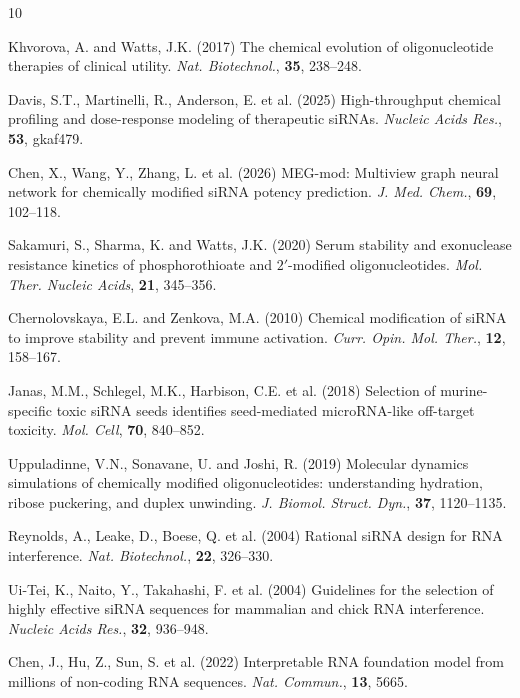 \documentclass[twocolumn]{article}
\begin{document}

\begin{thebibliography}{10}

Khvorova, A. and Watts, J.K. (2017) The chemical evolution of oligonucleotide therapies of clinical utility. \textit{Nat. Biotechnol.}, \textbf{35}, 238--248.

Davis, S.T., Martinelli, R., Anderson, E. et al. (2025) High-throughput chemical profiling and dose-response modeling of therapeutic siRNAs. \textit{Nucleic Acids Res.}, \textbf{53}, gkaf479.

Chen, X., Wang, Y., Zhang, L. et al. (2026) MEG-mod: Multiview graph neural network for chemically modified siRNA potency prediction. \textit{J. Med. Chem.}, \textbf{69}, 102--118.

Sakamuri, S., Sharma, K. and Watts, J.K. (2020) Serum stability and exonuclease resistance kinetics of phosphorothioate and $2'$-modified oligonucleotides. \textit{Mol. Ther. Nucleic Acids}, \textbf{21}, 345--356.

Chernolovskaya, E.L. and Zenkova, M.A. (2010) Chemical modification of siRNA to improve stability and prevent immune activation. \textit{Curr. Opin. Mol. Ther.}, \textbf{12}, 158--167.

Janas, M.M., Schlegel, M.K., Harbison, C.E. et al. (2018) Selection of murine-specific toxic siRNA seeds identifies seed-mediated microRNA-like off-target toxicity. \textit{Mol. Cell}, \textbf{70}, 840--852.

Uppuladinne, V.N., Sonavane, U. and Joshi, R. (2019) Molecular dynamics simulations of chemically modified oligonucleotides: understanding hydration, ribose puckering, and duplex unwinding. \textit{J. Biomol. Struct. Dyn.}, \textbf{37}, 1120--1135.

Reynolds, A., Leake, D., Boese, Q. et al. (2004) Rational siRNA design for RNA interference. \textit{Nat. Biotechnol.}, \textbf{22}, 326--330.

Ui-Tei, K., Naito, Y., Takahashi, F. et al. (2004) Guidelines for the selection of highly effective siRNA sequences for mammalian and chick RNA interference. \textit{Nucleic Acids Res.}, \textbf{32}, 936--948.

Chen, J., Hu, Z., Sun, S. et al. (2022) Interpretable RNA foundation model from millions of non-coding RNA sequences. \textit{Nat. Commun.}, \textbf{13}, 5665.


\end{thebibliography}
\end{document}
